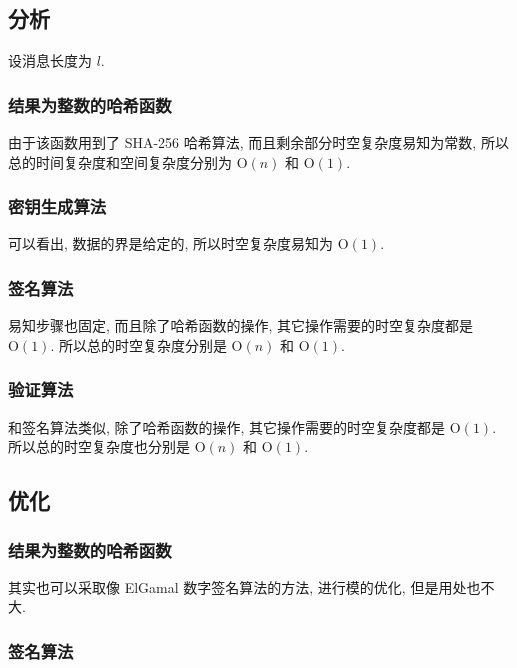 \documentclass[12pt,a4paper]{article}
\begin{document}
\subsection*{分析}

设消息长度为 $ l $. 

\subsubsection*{结果为整数的哈希函数}

由于该函数用到了 SHA-256 哈希算法, 而且剩余部分时空复杂度易知为常数, 所以总的时间复杂度和空间复杂度分别为 $ \mathrm{O}(n) $ 和 $ \mathrm{O}(1) $. 

\subsubsection*{密钥生成算法}

可以看出, 数据的界是给定的, 所以时空复杂度易知为 $ \mathrm{O}(1) $. 

\subsubsection*{签名算法}

易知步骤也固定, 而且除了哈希函数的操作, 其它操作需要的时空复杂度都是 $ \mathrm{O}(1) $. 所以总的时空复杂度分别是 $ \mathrm{O}(n) $ 和 $ \mathrm{O}(1) $. 

\subsubsection*{验证算法}

和签名算法类似, 除了哈希函数的操作, 其它操作需要的时空复杂度都是 $ \mathrm{O}(1) $. 所以总的时空复杂度也分别是 $ \mathrm{O}(n) $ 和 $ \mathrm{O}(1) $. 

\subsection*{优化}

\subsubsection*{结果为整数的哈希函数}

其实也可以采取像 ElGamal 数字签名算法的方法, 进行模的优化, 但是用处也不大.  

\subsubsection*{签名算法}
\end{document}
